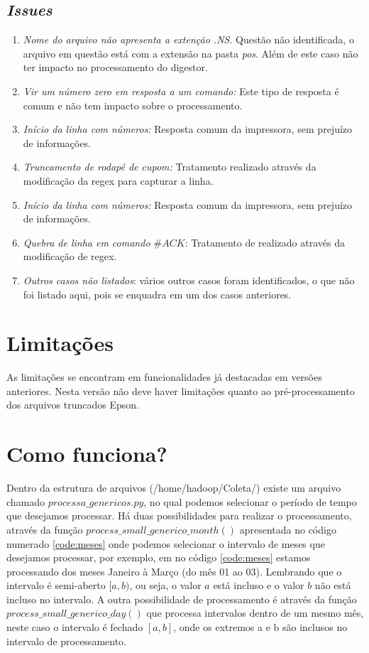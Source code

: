 \documentclass{article}      %
\begin{document}
\subsection{\emph{Issues}}
\begin{enumerate}
    \item \emph{Nome do arquivo não apresenta a extenção .NS}. Questão não identificada, o arquivo em questão está com a extensão na pasta \emph{pos}. Além de este caso não ter impacto no processamento do digestor.
    \item \emph{Vir um número zero em resposta a um comando:} Este tipo de resposta é comum e não tem impacto sobre o processamento.
    \item \emph{Início da linha com números:} Resposta comum da impressora, sem prejuízo de informações.
    \item \emph{Truncamento de rodapé de cupom:} Tratamento realizado através da modificação da regex para capturar a linha.
    \item \emph{Início da linha com números:} Resposta comum da impressora, sem prejuízo de informações.
    \item \emph{Quebra de linha em comando $\#ACK$}: Tratamento de realizado através da modificação de regex.
    \item \emph{Outros casos não listados}: vários outros casos foram identificados, o que não foi listado aqui, pois se enquadra em um dos casos anteriores.
\end{enumerate}


\section{Limitações}
As limitações se encontram em funcionalidades já destacadas em versões anteriores. Nesta versão não deve haver limitações quanto ao pré-processamento dos arquivos truncados Epson.

\section{Como funciona?}

Dentro da estrutura de arquivos (/home/hadoop/Coleta/) existe um arquivo chamado $processa\_genericos.py$, 
no qual podemos selecionar o período de tempo que desejamos processar. Há duas possibilidades para realizar o processamento, através da função $process\_small\_generico\_month()$ apresentada no código numerado \ref{code:meses} onde podemos selecionar o intervalo de meses que desejamos processar, por exemplo, em no código \ref{code:meses} estamos processando dos meses Janeiro à Março (do mês 01 ao 03). Lembrando que o intervalo é semi-aberto $[a,b)$, ou seja, o valor $a$ está incluso e o valor $b$ não está incluso no intervalo. A outra possibilidade de processamento é através da função $process\_small\_generico\_day()$ que processa intervalos dentro de um mesmo mês, neste caso o intervalo é fechado $[a,b]$, onde os extremos a e b são inclusos no intervalo de processamento.    
\end{document}
